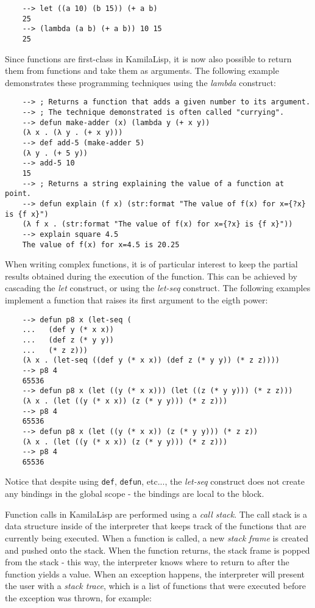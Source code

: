 \begin{Verbatim}
    --> let ((a 10) (b 15)) (+ a b)
    25
    --> (lambda (a b) (+ a b)) 10 15
    25
\end{Verbatim}

Since functions are first-class in KamilaLisp, it is now also possible to return them from functions and take them as arguments. The following example demonstrates these programming techniques using the \textit{lambda} construct:

\begin{Verbatim}
    --> ; Returns a function that adds a given number to its argument.
    --> ; The technique demonstrated is often called "currying".
    --> defun make-adder (x) (lambda y (+ x y))
    (λ x . (λ y . (+ x y)))
    --> def add-5 (make-adder 5)
    (λ y . (+ 5 y))
    --> add-5 10
    15
    --> ; Returns a string explaining the value of a function at point.
    --> defun explain (f x) (str:format "The value of f(x) for x={?x} is {f x}")
    (λ f x . (str:format "The value of f(x) for x={?x} is {f x}"))
    --> explain square 4.5
    The value of f(x) for x=4.5 is 20.25
\end{Verbatim}

When writing complex functions, it is of particular interest to keep the partial results obtained during the execution of the function. This can be achieved by cascading the \textit{let} construct, or using the \textit{let-seq} construct. The following examples implement a function that raises its first argument to the eigth power:

\begin{Verbatim}
    --> defun p8 x (let-seq (
    ...   (def y (* x x))
    ...   (def z (* y y))
    ...   (* z z)))
    (λ x . (let-seq ((def y (* x x)) (def z (* y y)) (* z z))))
    --> p8 4
    65536
    --> defun p8 x (let ((y (* x x))) (let ((z (* y y))) (* z z)))
    (λ x . (let ((y (* x x)) (z (* y y))) (* z z)))
    --> p8 4
    65536
    --> defun p8 x (let ((y (* x x)) (z (* y y))) (* z z))
    (λ x . (let ((y (* x x)) (z (* y y))) (* z z)))
    --> p8 4
    65536
\end{Verbatim}

Notice that despite using \verb|def|, \verb|defun|, etc..., the \textit{let-seq} construct does not create any bindings in the global scope - the bindings are local to the block.

Function calls in KamilaLisp are performed using a \textit{call stack}. The call stack is a data structure inside of the interpreter that keeps track of the functions that are currently being executed. When a function is called, a new \textit{stack frame} is created and pushed onto the stack. When the function returns, the stack frame is popped from the stack - this way, the interpreter knows where to return to after the function yields a value. When an exception happens, the interpreter will present the user with a \textit{stack trace}, which is a list of functions that were executed before the exception was thrown, for example:

